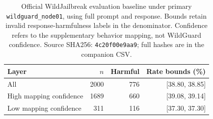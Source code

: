 \begin{table}[t]
\centering\small
\begin{tabular}{lrrr}
\toprule
Layer & $n$ & Harmful & Rate bounds (\%) \\
\midrule
All & 2000 & 776 & [38.80, 38.85] \\
High mapping confidence & 1689 & 660 & [39.08, 39.14] \\
Low mapping confidence & 311 & 116 & [37.30, 37.30] \\
\bottomrule
\end{tabular}
\caption{Official WildJailbreak evaluation baseline under primary \texttt{wildguard\_node01}, using full prompt and response. Bounds retain invalid response-harmfulness labels in the denominator. Confidence refers to the supplementary behavior mapping, not WildGuard confidence. Source SHA256: \texttt{4c20f00e9aa9}; full hashes are in the companion CSV.}
\label{tab:wildguard-alpha0}
\end{table}
